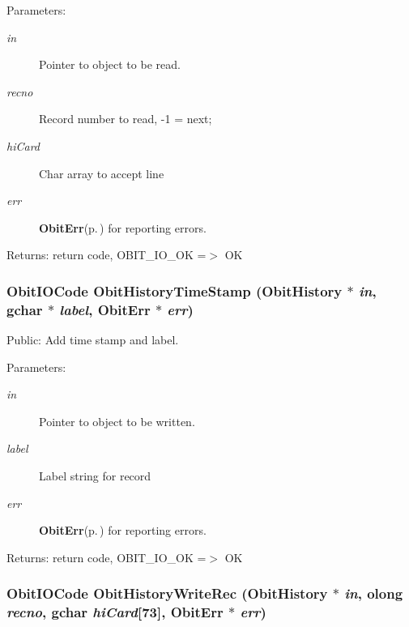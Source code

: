 \begin{Desc}
\item[Parameters:]
\begin{description}
\item[{\em in}]Pointer to object to be read. \item[{\em recno}]Record number to read, -1 = next; \item[{\em hi\-Card}]Char array to accept line \item[{\em err}]{\bf Obit\-Err}{\rm (p.\,\pageref{structObitErr})} for reporting errors. \end{description}
\end{Desc}
\begin{Desc}
\item[Returns:]return code, OBIT\_\-IO\_\-OK =$>$ OK \end{Desc}
\subsubsection{\setlength{\rightskip}{0pt plus 5cm}Obit\-IOCode Obit\-History\-Time\-Stamp ({\bf Obit\-History} $\ast$ {\em in}, gchar $\ast$ {\em label}, {\bf Obit\-Err} $\ast$ {\em err})}\label{ObitHistory_8h_a21}


Public: Add time stamp and label. 

\begin{Desc}
\item[Parameters:]
\begin{description}
\item[{\em in}]Pointer to object to be written. \item[{\em label}]Label string for record \item[{\em err}]{\bf Obit\-Err}{\rm (p.\,\pageref{structObitErr})} for reporting errors. \end{description}
\end{Desc}
\begin{Desc}
\item[Returns:]return code, OBIT\_\-IO\_\-OK =$>$ OK \end{Desc}
\subsubsection{\setlength{\rightskip}{0pt plus 5cm}Obit\-IOCode Obit\-History\-Write\-Rec ({\bf Obit\-History} $\ast$ {\em in}, {\bf olong} {\em recno}, gchar {\em hi\-Card}[73], {\bf Obit\-Err} $\ast$ {\em err})}\label{ObitHistory_8h_a20}


